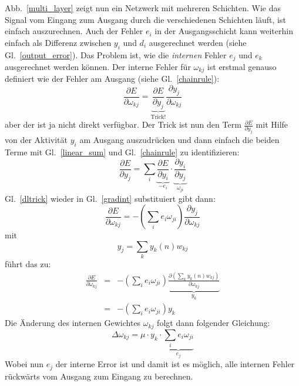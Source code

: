 \documentclass[12pt]{article}
\begin{document}
Abb.~\ref{multi_layer} zeigt nun ein Netzwerk mit mehreren
Schichten. Wie das Signal vom Eingang zum Ausgang durch die
verschiedenen Schichten läuft, ist einfach auszurechnen. Auch der
Fehler $e_i$ in der Ausgangsschicht kann weiterhin einfach als
Differenz zwischen $y_i$ und $d_i$ ausgerechnet werden (siehe
Gl.~\ref{output_error}). Das Problem ist, wie die \textsl{internen} Fehler
$e_j$ und $e_k$ ausgerechnet werden können.
Der interne Fehler für $\omega_{kj}$ ist erstmal genauso definiert wie der Fehler
am Ausgang (siehe Gl.~\ref{chainrule}):
\begin{equation}
  \frac{\partial E}{\partial \omega_{kj}} = \underbrace{\frac{\partial E}{\partial y_j}}_\textrm{Trick!} \frac{\partial y_j}{\partial \omega_{kj}}
  \label{gradint}
\end{equation}
aber der ist ja nicht direkt verfügbar. Der Trick ist nun den Term
$\frac{\partial E}{\partial y_j}$ mit Hilfe von der Aktivität $y_i$ am
Ausgang auszudrücken und dann einfach die beiden Terme mit
Gl.~\ref{linear_sum} und Gl.~\ref{chainrule} zu identifizieren:
\begin{equation}
  \frac{\partial E}{\partial y_j} = \sum_i \underbrace{\frac{\partial E}{\partial y_i}}_{-e_i} \cdot \underbrace{\frac{\partial y_i}{\partial y_j}}_{\omega_{ji}} \label{dltrick}
\end{equation}
Gl.~\ref{dltrick} wieder in Gl.~\ref{gradint} substituiert gibt dann:
\begin{equation}
  \frac{\partial E}{\partial \omega_{kj}} = - \left( \sum_i e_i \omega_{ji} \right) \frac{\partial y_j}{\partial \omega_{kj}}
  \label{gradintback}
\end{equation}
mit
\begin{equation}
y_j = \sum_k y_k(n) w_{kj}
\end{equation}
führt das zu:
\begin{eqnarray}
  \frac{\partial E}{\partial \omega_{kj}} & = & - \left( \sum_i e_i \omega_{ji} \right) \underbrace{\frac{\partial \left(\sum_k y_k(n) w_{kj}\right)}{\partial \omega_{kj}}}_{y_k} \\
                                         & = & - \left( \sum_i e_i \omega_{ji} \right) y_k
\end{eqnarray}
Die Änderung des internen Gewichtes $\omega_{kj}$ folgt dann folgender Gleichung:
\begin{equation}
\Delta\omega_{kj} = \mu \cdot y_k \cdot \underbrace{\sum_i e_i \omega_{ji}}_{e_j}
\end{equation}
Wobei nun $e_j$ der interne Error ist und damit ist es möglich, alle internen Fehler rückwärts vom Ausgang zum Eingang zu berechnen.
\end{document}
